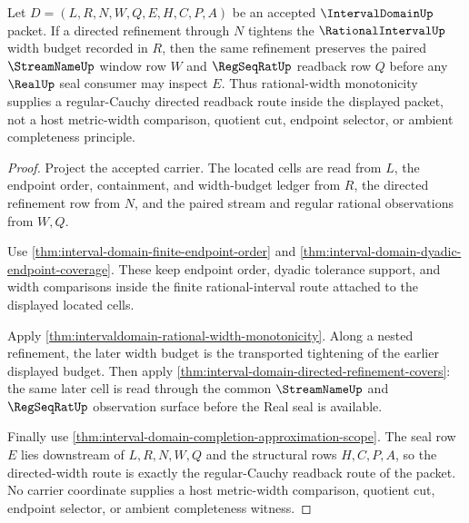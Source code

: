 \begin{theorem}
\label{thm:interval-domain-regular-cauchy-directed-width}
Let $D=(L,R,N,W,Q,E,H,C,P,A)$ be an accepted $\IntervalDomainUp$ packet. If a directed refinement through $N$ tightens the $\RationalIntervalUp$ width budget recorded in $R$, then the same refinement preserves the paired $\StreamNameUp$ window row $W$ and $\RegSeqRatUp$ readback row $Q$ before any $\RealUp$ seal consumer may inspect $E$. Thus rational-width monotonicity supplies a regular-Cauchy directed readback route inside the displayed packet, not a host metric-width comparison, quotient cut, endpoint selector, or ambient completeness principle.
\end{theorem}
\begin{proof}
Project the accepted carrier. The located cells are read from $L$, the endpoint order, containment, and width-budget ledger from $R$, the directed refinement row from $N$, and the paired stream and regular rational observations from $W,Q$.

Use \autoref{thm:interval-domain-finite-endpoint-order} and \autoref{thm:interval-domain-dyadic-endpoint-coverage}. These keep endpoint order, dyadic tolerance support, and width comparisons inside the finite rational-interval route attached to the displayed located cells.

Apply \autoref{thm:intervaldomain-rational-width-monotonicity}. Along a nested refinement, the later width budget is the transported tightening of the earlier displayed budget. Then apply \autoref{thm:interval-domain-directed-refinement-covers}: the same later cell is read through the common $\StreamNameUp$ and $\RegSeqRatUp$ observation surface before the Real seal is available.

Finally use \autoref{thm:interval-domain-completion-approximation-scope}. The seal row $E$ lies downstream of $L,R,N,W,Q$ and the structural rows $H,C,P,A$, so the directed-width route is exactly the regular-Cauchy readback route of the packet. No carrier coordinate supplies a host metric-width comparison, quotient cut, endpoint selector, or ambient completeness witness.
\end{proof}

